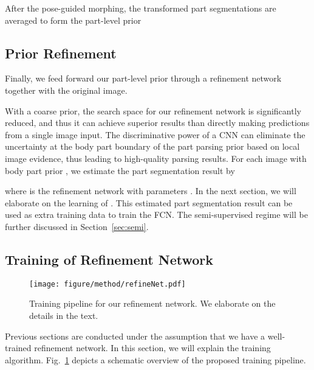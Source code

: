 \documentclass[10pt,twocolumn,letterpaper]{article}
\begin{document}
After the pose-guided morphing, the transformed part segmentations  are averaged to form the part-level prior

\subsection{Prior Refinement}
\label{sec:refinement}
Finally, we feed forward our part-level prior through a refinement network together with the original image.

With a coarse prior, the search space for our refinement network is significantly reduced, and thus it can achieve superior results than directly making predictions from a single image input. The discriminative power of a CNN can eliminate the uncertainty at the body part boundary of the part parsing prior based on local image evidence, thus leading to high-quality parsing results. For each image  with body part prior , we estimate the part segmentation result  by

where  is the refinement network with parameters . In the next section, we will elaborate on the learning of . This estimated part segmentation result can be used as extra training data to train the FCN. The semi-supervised regime will be further discussed in Section~\ref{sec:semi}.

\subsection{Training of Refinement Network}
\label{sec:refineNet}
\begin{figure}[t]
\begin{center}
   \texttt{[image: figure/method/refineNet.pdf]}
\end{center}
\vspace{-3mm}
   \caption{Training pipeline for our refinement network. We elaborate on the details in the text.}
\label{fig:refineNet}
\vspace{-3mm}
\end{figure}
Previous sections are conducted under the assumption that we have a well-trained refinement network. In this section, we will explain the training algorithm. Fig.~\ref{fig:refineNet} depicts a schematic overview of the proposed training pipeline.
\end{document}
